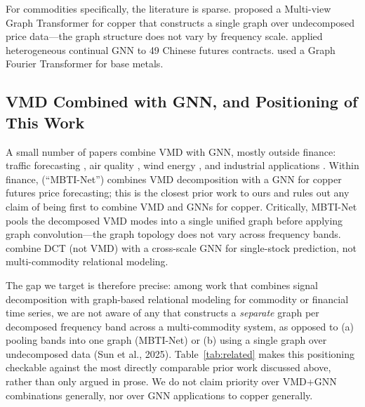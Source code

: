 \documentclass[journal]{IEEEtran}
\begin{document}
For commodities specifically, the literature is sparse. \citet{Sun2025} proposed a Multi-view Graph Transformer for copper that constructs a single graph over undecomposed price data---the graph structure does not vary by frequency scale. \citet{Hu2023} applied heterogeneous continual GNN to 49 Chinese futures contracts. \citet{Zhai2024} used a Graph Fourier Transformer for base metals.

\subsection{VMD Combined with GNN, and Positioning of This Work}

A small number of papers combine VMD with GNN, mostly outside finance: traffic forecasting \citep{Ahmad2024, Ahmad2025}, air quality \citep{Pei2022}, wind energy \citep{ChengTsai2026, Bao2025}, and industrial applications \citep{Yuan2025}. Within finance, \citet{LiLiu2026} (``MBTI-Net'') combines VMD decomposition with a GNN for copper futures price forecasting; this is the closest prior work to ours and rules out any claim of being first to combine VMD and GNNs for copper. Critically, MBTI-Net pools the decomposed VMD modes into a single unified graph before applying graph convolution---the graph topology does not vary across frequency bands. \citet{ZhengZhufu2025} combine DCT (not VMD) with a cross-scale GNN for single-stock prediction, not multi-commodity relational modeling.

The gap we target is therefore precise: among work that combines signal decomposition with graph-based relational modeling for commodity or financial time series, we are not aware of any that constructs a \emph{separate} graph per decomposed frequency band across a multi-commodity system, as opposed to (a) pooling bands into one graph (MBTI-Net) or (b) using a single graph over undecomposed data (Sun et al., 2025). Table~\ref{tab:related} makes this positioning checkable against the most directly comparable prior work discussed above, rather than only argued in prose. We do not claim priority over VMD+GNN combinations generally, nor over GNN applications to copper generally.
\end{document}
